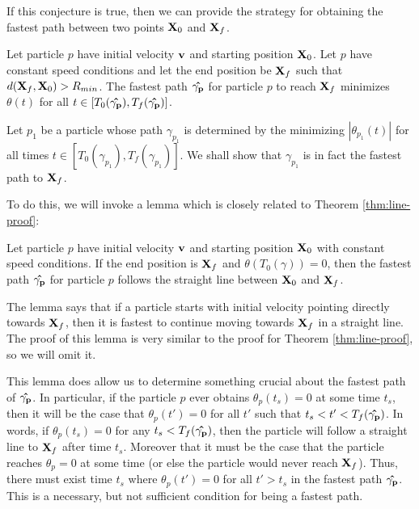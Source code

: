 If this conjecture is true, then we can provide the strategy for obtaining the fastest path between two points $\mathbf{X}_0$ and $\mathbf{X}_f$.

\begin{theorem}
  Let particle $p$ have initial velocity $\mathbf{v}$ and starting position $\mathbf{X}_0$. Let $p$ have constant speed conditions and let the end position be $\mathbf{X}_f$ such that $d(\mathbf{X}_f, \mathbf{X}_0) > R_{min}$. The fastest path $\mathbf{\hat{\gamma_p}}$ for particle $p$ to reach $\mathbf{X}_f$ minimizes $\theta(t)$ for all $t \in [T_0(\mathbf{\hat{\gamma_p}}), T_f(\mathbf{\hat{\gamma_p}})]$.
  \label{thm:restricted-theta}
\end{theorem}
\proof Let $p_1$ be a particle whose path $\gamma_{p_1}$ is determined by the minimizing $|\theta_{p_1}(t)|$ for all times $t \in [T_0(\gamma_{p_1}), T_f(\gamma_{p_1})]$. We shall show that $\gamma_{p_1}$ is in fact the fastest path to $\mathbf{X}_f$.

To do this, we will invoke a lemma which is closely related to Theorem \ref{thm:line-proof}:

\begin{lemma}
  Let particle $p$ have initial velocity $\mathbf{v}$ and starting position $\mathbf{X}_0$ with constant speed conditions. If the end position is $\mathbf{X}_f$ and $\theta(T_0(\gamma)) = 0$, then the fastest path $\mathbf{\hat{\gamma_p}}$ for particle $p$ follows the straight line between $\mathbf{X}_0$ and $\mathbf{X}_f$.
\end{lemma}

The lemma says that if a particle starts with initial velocity pointing directly towards $\mathbf{X}_f$, then it is fastest to continue moving towards $\mathbf{X}_f$ in a straight line. The proof of this lemma is very similar to the proof for Theorem \ref{thm:line-proof}, so we will omit it.

This lemma does allow us to determine something crucial about the fastest path of $\mathbf{\hat{\gamma_{p}}}$. In particular, if the particle $p$ ever obtains $\theta_p(t_s) = 0$ at some time $t_s$, then it will be the case that $\theta_p(t') = 0$ for all $t'$ such that $t_s < t' < T_f(\mathbf{\hat{\gamma_p}})$. In words, if $\theta_p(t_s) = 0$ for any $t_s < T_f(\mathbf{\hat{\gamma_p}})$, then the particle will follow a straight line to $\mathbf{X}_f$ after time $t_s$. Moreover that it must be the case that the particle reaches $\theta_p = 0$ at some time (or else the particle would never reach $\mathbf{X}_f$). Thus, there must exist time $t_s$ where $\theta_p(t') = 0$ for all $t' > t_s$ in the fastest path $\mathbf{\hat{\gamma_p}}$. This is a necessary, but not sufficient condition for being a fastest path.

